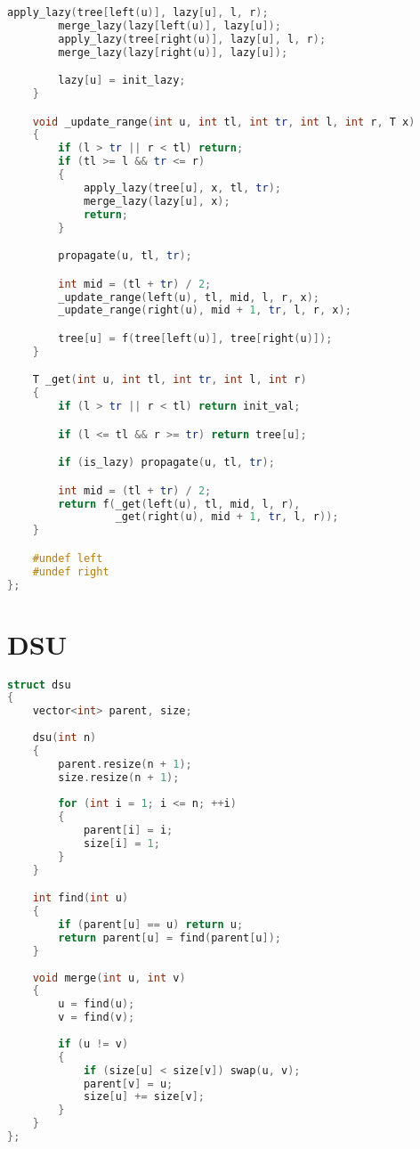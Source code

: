 \begin{lstlisting}[language=C++]
        apply_lazy(tree[left(u)], lazy[u], l, r);
        merge_lazy(lazy[left(u)], lazy[u]);
        apply_lazy(tree[right(u)], lazy[u], l, r);
        merge_lazy(lazy[right(u)], lazy[u]);

        lazy[u] = init_lazy;
    }

    void _update_range(int u, int tl, int tr, int l, int r, T x)
    {
        if (l > tr || r < tl) return;
        if (tl >= l && tr <= r)
        {
            apply_lazy(tree[u], x, tl, tr);
            merge_lazy(lazy[u], x);
            return;
        }

        propagate(u, tl, tr);

        int mid = (tl + tr) / 2;
        _update_range(left(u), tl, mid, l, r, x);
        _update_range(right(u), mid + 1, tr, l, r, x);

        tree[u] = f(tree[left(u)], tree[right(u)]);
    }

    T _get(int u, int tl, int tr, int l, int r)
    {
        if (l > tr || r < tl) return init_val;

        if (l <= tl && r >= tr) return tree[u];

        if (is_lazy) propagate(u, tl, tr);

        int mid = (tl + tr) / 2;
        return f(_get(left(u), tl, mid, l, r),
                 _get(right(u), mid + 1, tr, l, r));
    }

    #undef left
    #undef right
};
\end{lstlisting}
\sectionend

\section{DSU}
\begin{lstlisting}[language=C++]
struct dsu
{
    vector<int> parent, size;
 
    dsu(int n)
    {
        parent.resize(n + 1);
        size.resize(n + 1);
 
        for (int i = 1; i <= n; ++i)
        {
            parent[i] = i;
            size[i] = 1;
        }
    }

    int find(int u)
    {
        if (parent[u] == u) return u;
        return parent[u] = find(parent[u]);
    }
 
    void merge(int u, int v)
    {
        u = find(u);
        v = find(v);
 
        if (u != v)
        {
            if (size[u] < size[v]) swap(u, v);
            parent[v] = u;
            size[u] += size[v];
        }
    }
};
\end{lstlisting}
\sectionend
